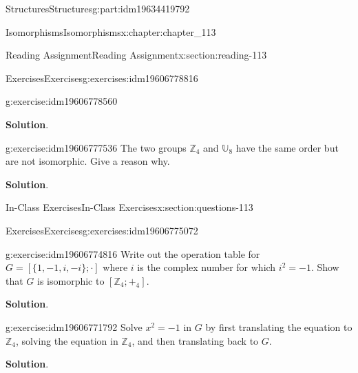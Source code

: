 \documentclass[oneside,10pt,]{book}
\newcommand{\blocktitlefont}{\relax}
\numberwithin{equation}{section}
\begin{document}
\begin{partptx}{Structures}{}{Structures}{}{}{g:part:idm19634419792}
\begin{chapterptx}{Isomorphisms}{}{Isomorphisms}{}{}{x:chapter:chapter_113}
\begin{sectionptx}{Reading Assignment}{}{Reading Assignment}{}{}{x:section:reading-113}
\begin{exercises-subsection-numberless}{Exercises}{}{Exercises}{}{}{g:exercises:idm19606778816}
\begin{exercisegroup}
\begin{divisionexerciseeg}{1}{}{}{g:exercise:idm19606778560}
\par\smallskip%
\noindent\textbf{\blocktitlefont Solution}.\hypertarget{g:solution:idm19606777664}{}\quad{}%
\end{divisionexerciseeg}%
\begin{divisionexerciseeg}{2}{}{}{g:exercise:idm19606777536}%
The two groups \(\mathbb{Z}_4\) and \(\mathbb{U}_8\) have the same order but are not isomorphic.  Give a reason why.%
\par\smallskip%
\noindent\textbf{\blocktitlefont Solution}.\hypertarget{g:solution:idm19606776064}{}\quad{}%
\end{divisionexerciseeg}%
\end{exercisegroup}
\par\medskip\noindent
\end{exercises-subsection-numberless}
\end{sectionptx}
%
%
\typeout{************************************************}
\typeout{************************************************}
%
\begin{sectionptx}{In-Class Exercises}{}{In-Class Exercises}{}{}{x:section:questions-113}
%
%
%
\typeout{************************************************}
\typeout{************************************************}
%
\begin{exercises-subsection-numberless}{Exercises}{}{Exercises}{}{}{g:exercises:idm19606775072}
\par\medskip\noindent%
%
\begin{exercisegroup}
\begin{divisionexerciseeg}{1}{}{}{g:exercise:idm19606774816}%
Write out the operation table for \(G = [\{1, -1, i, -i \}; \cdot ]\) where \(i\) is the complex number for which \(i^2 = - 1\). Show that \(G\) is isomorphic to \(\left[\mathbb{Z}_4;+_4\right]\).%
\par\smallskip%
\noindent\textbf{\blocktitlefont Solution}.\hypertarget{g:solution:idm19606774688}{}\quad{}%
\end{divisionexerciseeg}%
\begin{divisionexerciseeg}{2}{}{}{g:exercise:idm19606771792}%
Solve \(x^2= -1\) in \(G\) by first translating the equation to \(\mathbb{Z}_4\), solving the equation in \(\mathbb{Z}_4\), and then translating back to \(G\).%
\par\smallskip%
\noindent\textbf{\blocktitlefont Solution}.\hypertarget{g:solution:idm19606771664}{}\quad{}%
\end{divisionexerciseeg}%

\end{exercisegroup}
\end{exercises-subsection-numberless}
\end{sectionptx}
\end{chapterptx}
\end{partptx}
\end{document}

